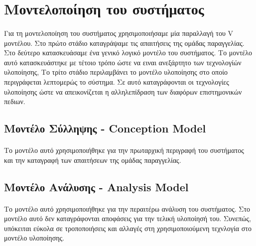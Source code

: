 \documentclass[a4paper,12pt,twoside]{report}
\begin{document}
{		\section{Μοντελοποίηση του συστήματος}
		
			\paragraph{} {Για τη μοντελοποίηση του συστήματος χρησιμοποιήσαμε μία παραλλαγή του V μοντέλου. Στο πρώτο στάδιο καταγράψαμε τις απαιτήσεις της ομάδας παραγγελίας. Στο δεύτερο κατασκευάσαμε ένα γενικό λογικό μοντέλο του συστήματος. Το μοντέλο αυτό κατασκευάστηκε με τέτοιο τρόπο ώστε να ειναι ανεξάρτητο των τεχνολογίών υλοποίησης, Το τρίτο στάδιο περιλαμβάνει το μοντέλο υλοποίησης στο οποίο περιγράφεται λεπτομερώς το σύστημα. Σε αυτό καταγράφονται οι τεχνολογίες υλοποίησης ώστε να απεικονίζεται η αλληλεπίδραση των διαφόρων επιστημονικών πεδιων.
			}

			\subsection{Μοντέλο Σύλληψης - Conception Model}
			
				\paragraph{} {Το μοντέλο αυτό χρησιμοποιήθηκε για την πρωταρχική περιγραφή του συστήματος και την καταγραφή των απαιτήσεων της ομάδας παραγγελίας.
				}
			
			\subsection{Μοντέλο Ανάλυσης - Analysis Model}
			
				\paragraph{} {Το μοντέλο αυτό χρησιμοποιήθηκε για την περαιτέρω ανάλυση του συστήματος. Στο μοντέλο αυτό δεν καταγράφονται αποφάσεις για την τελική υλοποίησή του. Συνεπώς, υπόκειται εύκολα σε τροποποιήσεις και αλλαγές στη χρησιμοποιούμενη τεχνλογία στο μοντέλο υλοποίησης.
				}			
			
}
\end{document}
